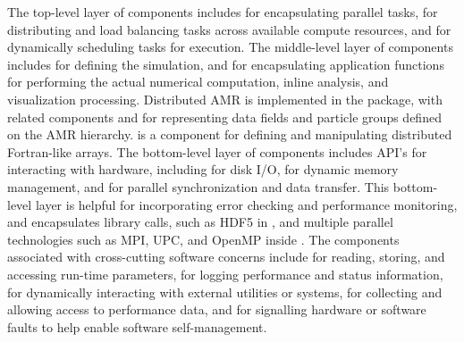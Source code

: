 \documentclass[11pt,letterpaper]{article}
\begin{document}


The top-level layer of components includes  for encapsulating parallel
tasks,  for distributing and load balancing tasks
across available compute resources, and  for
dynamically scheduling tasks for execution.
%
The middle-level layer of components includes  for
defining the simulation, and  for encapsulating application
functions for performing the actual numerical computation, inline
analysis, and visualization processing.
Distributed AMR is implemented in the  package, with related
components  and  for representing data
fields and particle groups defined on the AMR hierarchy.  
is a component for defining and manipulating distributed Fortran-like
arrays.
%
The bottom-level layer of components includes API's for interacting
with hardware, including  for disk I/O,  for
dynamic memory management, and  for parallel
synchronization and data transfer.  This bottom-level layer is helpful
for incorporating error checking and performance monitoring, and
encapsulates library calls, such as HDF5 in , and multiple
parallel technologies such as MPI, UPC, and OpenMP inside
.
%
The components associated with cross-cutting software concerns include
 for reading, storing, and accessing run-time
parameters,  for logging performance and status
information,  for dynamically interacting with external
utilities or systems,  for collecting and allowing access
to performance data, and  for signalling hardware or
software faults to help enable software self-management.

\end{document}
